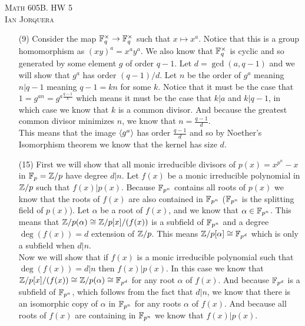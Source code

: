 \documentclass[12pt]{amsart}
\begin{document}
\begin{center}
    \textsc{Math 605B. HW 5\\ Ian Jorquera}
\end{center}
\vspace{1em}


\begin{itemize}
\item[(9)] Consider the map $\mathbb{F}_q^\times\rightarrow \mathbb{F}_q^\times$ such that $x\mapsto x^a$. Notice that this is a group homomorphism as $(xy)^a=x^ay^a$. We also know that $\mathbb{F}_q^\times$ is cyclic and so generated by some element $g$ of order $q-1$. Let $d=\gcd(a,q-1)$ and we will show that $g^a$ has order $(q-1)/d$. Let $n$ be the order of $g^a$ meaning $n|q-1$ meaning $q-1=kn$ for some $k$. Notice that it must be the case that $1=g^{an}=g^{a\frac{q-1}{k}}$ which means it must be the case that $k|a$ and $k|q-1$, in which case we know that $k$ is a common divisor. And because the greatest common divisor minimizes $n$, we know that $n=\frac{q-1}{d}$.\\

This means that the image $\langle g^a\rangle$ has order $\frac{q-1}{d}$ and so by Noether's Isomorphism theorem we know that the kernel has size $d$. \\

\item[(15)] 
First we will show that all monic irreducible divisors of $p(x)=x^{p^n}-x$ in $\mathbb{F}_p=\mathbb{Z}/p$ have degree $d|n$. Let $f(x)$ be a monic irreducible polynomial in $\mathbb{Z}/p$ such that $f(x)|p(x)$. Because $\mathbb{F}_{p^n}$ contains all roots of $p(x)$ we know that the roots of $f(x)$ are also contained in $\mathbb{F}_{p^n}$ ($\mathbb{F}_{p^n}$ is the splitting field of $p(x)$). Let $\alpha$ be a root of $f(x)$, and we know that $\alpha\in \mathbb{F}_{p^n}$. This means that $\mathbb{Z}/p(\alpha)\cong \mathbb{Z}/p[x]/(f(x))$ is a subfield of $\mathbb{F}_{p^n}$ and a degree $\deg(f(x))=d$ extension of $\mathbb{Z}/p$. This means $\mathbb{Z}/p[\alpha]\cong \mathbb{F}_{p^d}$ which is only a subfield when $d|n$.\\

Now we will show that if $f(x)$ is a monic irreducible polynomial such that $\deg(f(x))=d|n$ then $f(x)|p(x)$. In this case we know that $\mathbb{Z}/p[x]/(f(x))\cong \mathbb{Z}/p(\alpha)\cong \mathbb{F}_{p^d}$ for any root $\alpha$ of $f(x)$. And because $\mathbb{F}_{p^d}$ is a subfield of $\mathbb{F}_{p^n}$, which follows from the fact that $d|n$, we know that there is an isomorphic copy of $\alpha$ in $\mathbb{F}_{p^n}$ for any roots $\alpha$ of $f(x)$. And because all roots of $f(x)$ are containing in $\mathbb{F}_{p^n}$ we know that $f(x)|p(x)$.\\


\end{itemize}
\end{document}
